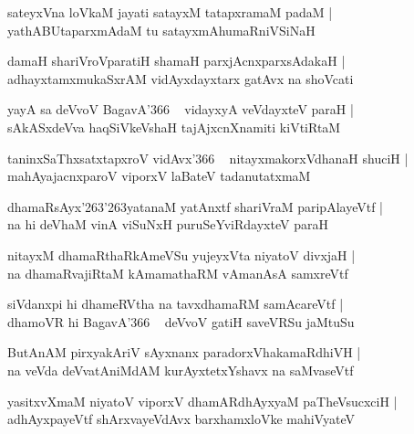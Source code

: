 \documentclass[twoside,12pt,openright]{book}
\def\S{\char'263}
\newcounter{shloka}[chapter]
\begin{document}
\begin{shloka}
sateyxVna loVkaM jayati satayxM tatapxramaM padaM |\\
yathABUtaparxmAdaM tu satayxmAhumaRniVSiNaH 
\end{shloka}

\begin{shloka}
damaH shariVroVparatiH shamaH parxjAcnxparxsAdakaH |\\
adhayxtamxmukaSxrAM vidAyxdayxtarx gatAvx na  shoVcati 
\end{shloka}

\begin{shloka}
yayA sa deVvoV BagavA\char'366 ~ vidayxyA veVdayxteV paraH |\\
sAkASxdeVva haqSiVkeVshaH tajAjxcnXnamiti kiVtiRtaM 
\end{shloka}

\begin{shloka}
taninxSaThxsatxtapxroV vidAvx\char'366 ~ nitayxmakorxVdhanaH shuciH |\\
mahAyajacnxparoV viporxV laBateV tadanutatxmaM 
\end{shloka}

\begin{shloka}
dhamaRsAyx\S\S yatanaM yatAnxtf shariVraM paripAlayeVtf |\\
na hi deVhaM vinA viSuNxH puruSeYviRdayxteV paraH  
\end{shloka}

\begin{shloka}
nitayxM dhamaRthaRkAmeVSu yujeyxVta niyatoV divxjaH |\\
na dhamaRvajiRtaM kAmamathaRM vAmanAsA samxreVtf
\end{shloka}

\begin{shloka}
siVdanxpi hi dhameRVtha na tavxdhamaRM samAcareVtf |\\
dhamoVR hi BagavA\char'366 ~ deVvoV gatiH saveVRSu jaMtuSu
\end{shloka}

\begin{shloka}
ButAnAM pirxyakAriV sAyxnanx paradorxVhakamaRdhiVH |\\
na veVda deVvatAniMdAM kurAyxtetxYshavx na saMvaseVtf 
\end{shloka}

\begin{shloka}
yasitxvXmaM niyatoV viporxV dhamARdhAyxyaM paTheVsucxciH |\\
adhAyxpayeVtf shArxvayeVdAvx barxhamxloVke mahiVyateV
\end{shloka}
\end{document}
